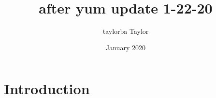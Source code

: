 \documentclass{article}
\title{after yum update 1-22-20}
\author{taylorba Taylor}
\date{January 2020}
\begin{document}
\maketitle

\section{Introduction}
\end{document}
